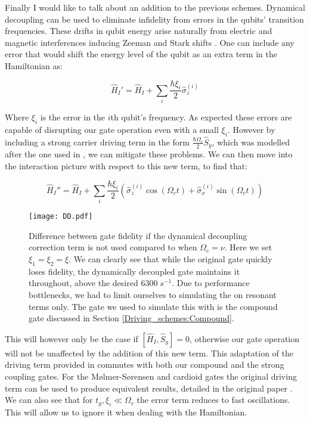 \documentclass[12pt,twoside]{report}
\begin{document}
Finally I would like to talk about an addition to the previous schemes. Dynamical decoupling can be used to eliminate infidelity from errors in the qubits' transition frequencies. These drifts in qubit energy arise naturally from electric and magnetic interferences inducing Zeeman and Stark shifts \cite{Foot}. One can include any error that would shift the energy level of the qubit as an extra term in the Hamiltonian as:

\begin{equation}
	\hat{H}_I' = \hat{H}_I + \sum_i \frac{\hbar \xi_i}{2} \hat{\sigma}_z^{\left(i\right)}
	\label{eq:qubit_err}
\end{equation}

Where $\xi_i$ is the error in the $i$th qubit's frequency. As expected these errors are capable of disrupting our gate operation even with a small $\xi_i$. However by including a strong carrier driving term in the form $\frac{\hbar \Omega_c}{2}\hat{S}_y$, which was modelled after the one used in \cite{DD_Paper}, we can mitigate these problems. We can then move into the interaction picture with respect to this new term, to find that:

\begin{equation}
	\hat{H}_I'' = \hat{H}_I + \sum_i \frac{\hbar \xi_i}{2}\left(\hat{\sigma}_z^{\left(i\right)}\cos\left(\Omega_c t\right) + \hat{\sigma}_x^{\left(i\right)}\sin\left(\Omega_c t\right)\right)
	\label{eq:qubit_err_I}
\end{equation}

\begin{figure}[b!]
	\centering
	\texttt{[image: DD.pdf]}
	\caption[Dynamical Decoupling]{Difference between gate fidelity if the dynamical decoupling correction term is not used compared to when $\Omega_c=\nu$. Here we set $\xi_1 = \xi_2 = \xi$. We can clearly see that while the original gate quickly loses fidelity, the dynamically decoupled gate maintains it throughout, above the desired $6300\;s^{-1}$. Due to performance bottlenecks, we had to limit ourselves to simulating the on resonant terms only. The gate we used to simulate this with is the compound gate discussed in Section \ref{Driving_schemes:Compound}.}
	\label{fig:DD}
\end{figure}

This will however only be the case if $[\hat{H}_I,\hat{S}_y]=0$, otherwise our gate operation will not be unaffected by the addition of this new term. This adaptation of the driving term provided in \cite{DD_Paper} commutes with both our compound and the strong coupling gates. For the M\o lmer-S\o rensen and cardioid gates the original driving term can be used to produce equivalent results, detailed in the original paper \cite{DD_Paper}. We can also see that for $t_g, \xi_i \ll \Omega_c$ the error term reduces to fast oscillations. This will allow us to ignore it when dealing with the Hamiltonian.
\end{document}
